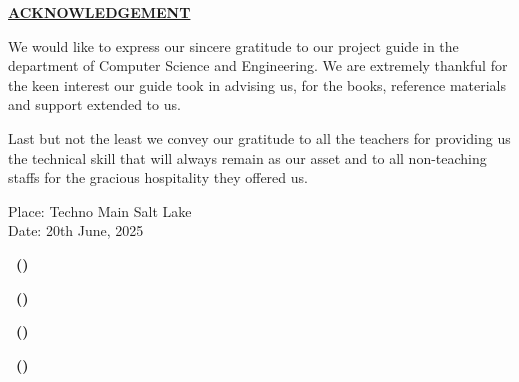 
\thispagestyle{plain}

\begin{center}
 \Large {\bf \uppercase {\underline {Acknowledgement}}}
\end{center}

\vspace{3\baselineskip}

\noindent
We would like to express our sincere gratitude to our project guide in the department of Computer Science and Engineering. We are extremely thankful for the keen interest our guide took in advising us, for the books, reference materials and support extended to us.


\vspace{\baselineskip}
\noindent
Last but not the least we convey our gratitude to all the teachers for providing us the technical skill that will always remain as our asset and to all non-teaching staffs for the gracious hospitality they offered us.

\vspace{\baselineskip}
\noindent
Place: Techno Main Salt Lake \\
Date: 20th June, 2025


\hspace{1.0\baselineskip}

\begin{flushright}

\vspace{2\baselineskip}
\textbf{\mynameone ~(\myrollnoone)}

\vspace{2\baselineskip}
\textbf{\mynametwo ~(\myrollnotwo)}

\vspace{2\baselineskip}
\textbf{\mynamethree ~(\myrollnothree)}

\vspace{2\baselineskip}
\textbf{\mynamefour ~(\myrollnofour)}

\end{flushright}


